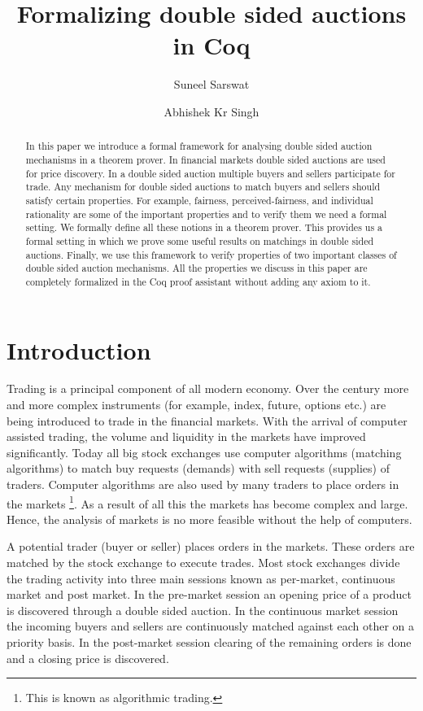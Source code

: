 \documentclass[a4paper,UKenglish,cleveref, autoref]{lipics-v2019}
\title{Formalizing double sided auctions in Coq} %
\author{Suneel Sarswat}{Tata Institute of Fundamental Research, India} {suneel.sarswat@gmail.com}
{}{}
\author{Abhishek Kr Singh}{Tata Institute of Fundamental Research, India} {abhishek.uor@gmail.com}
{}{}
\begin{document}
\newcommand{\tw}{\texttt}

\maketitle

\begin{abstract}


In this paper we introduce a formal framework for analysing double sided auction mechanisms in
a theorem prover. In financial markets double sided auctions are used for price discovery. 
In a double sided auction multiple buyers and sellers participate for trade. Any
mechanism for double sided auctions to match buyers and sellers should satisfy certain properties.
For example, fairness, perceived-fairness, and individual rationality are some of the important
properties and to verify them we need a formal setting. We formally define all these notions in a
theorem prover. This provides us a formal setting in which we prove some useful results on matchings
in double sided auctions. Finally, we use this framework to verify properties of two important
classes of double sided auction mechanisms. All the properties we discuss in this paper are completely
formalized in the Coq proof assistant without adding any axiom to it. 
\end{abstract}

\section{Introduction}
\label{section1}

Trading is a principal component of all modern economy. Over the century more and more
complex instruments (for example, index, future, options etc.) are being introduced to
trade in the financial markets. With the arrival of computer assisted trading, the volume
and liquidity in the markets have improved significantly. Today all big stock exchanges
use computer algorithms (matching algorithms) to match buy requests (demands) with sell
requests (supplies) of traders. Computer algorithms are also used by many traders to place
orders in the markets \footnote{This is known as algorithmic trading.}. As a result of all this the
markets has become complex and large. Hence, the analysis of markets is no more feasible
without the help of computers. 

A potential trader (buyer or seller) places orders in the markets. These orders are matched by the stock exchange to execute trades. Most stock exchanges divide the trading activity into three main sessions known as per-market, continuous market and post market. In the pre-market session an opening price of a product is discovered through a double sided auction. In the continuous market session the incoming buyers and sellers are continuously matched against each other on a priority basis. In the post-market session clearing of the remaining orders is done and a closing price is discovered.
\end{document}
